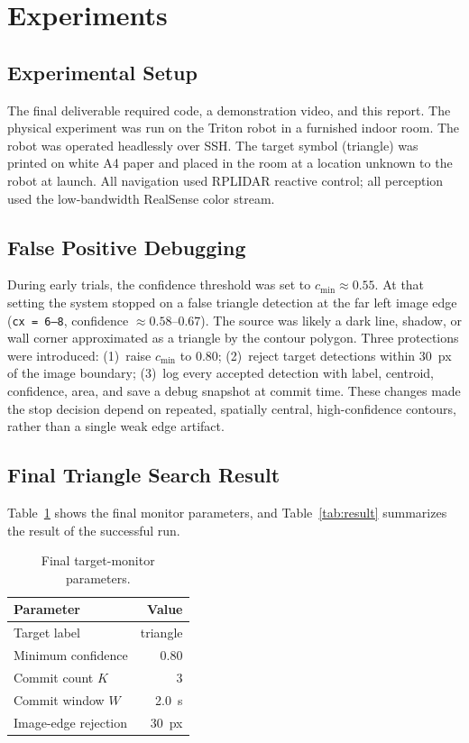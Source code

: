 \documentclass[letterpaper, 10 pt, conference]{ieeeconf/ieeeconf}
\begin{document}
\section{Experiments}
\label{sec:experiments}

\subsection{Experimental Setup}

The final deliverable required code, a demonstration video, and this report.
The physical experiment was run on the Triton robot in a furnished indoor room.
The robot was operated headlessly over SSH.
The target symbol (triangle) was printed on white A4 paper and placed in
the room at a location unknown to the robot at launch.
All navigation used RPLIDAR reactive control; all perception used the
low-bandwidth RealSense color stream.

\subsection{False Positive Debugging}

During early trials, the confidence threshold was set to $c_{\min} \approx 0.55$.
At that setting the system stopped on a false triangle detection at the far
left image edge (\texttt{cx = 6--8}, confidence $\approx 0.58$--$0.67$).
The source was likely a dark line, shadow, or wall corner approximated as a
triangle by the contour polygon.
Three protections were introduced: (1)~raise $c_{\min}$ to 0.80;
(2)~reject target detections within 30~px of the image boundary;
(3)~log every accepted detection with label, centroid, confidence, area,
and save a debug snapshot at commit time.
These changes made the stop decision depend on repeated, spatially central,
high-confidence contours, rather than a single weak edge artifact.

\subsection{Final Triangle Search Result}

Table~\ref{tab:params} shows the final monitor parameters, and
Table~\ref{tab:result} summarizes the result of the successful run.

\begin{table}[h]
\centering
\caption{Final target-monitor parameters.}
\label{tab:params}
\begin{tabular}{lr}
\toprule
Parameter & Value \\
\midrule
Target label & triangle \\
Minimum confidence & 0.80 \\
Commit count $K$ & 3 \\
Commit window $W$ & 2.0~s \\
Image-edge rejection & 30~px \\
\bottomrule
\end{tabular}
\end{table}
\end{document}
